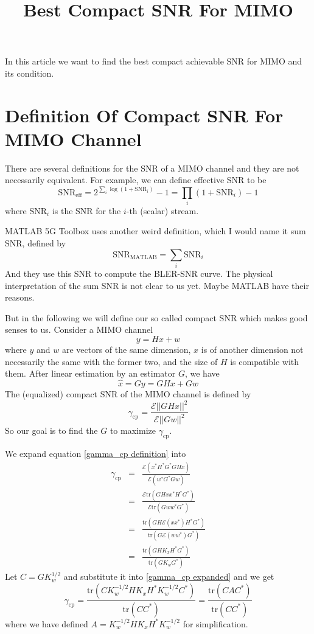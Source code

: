 \documentclass[12pt]{article}
\title{Best Compact SNR For MIMO}
\theoremstyle{definition}
\begin{document}
\maketitle
In this article we want to find the best compact achievable SNR for MIMO and its condition.
\section{Definition Of Compact SNR For MIMO Channel}
There are several definitions for the SNR of a MIMO channel and they are not necessarily equivalent. For example, we can define effective SNR to be
$$
\mbox{SNR}_{\mbox{eff}}=2^{\sum_i\log(1+\mbox{SNR}_i)}-1=\prod_i(1+\mbox{SNR}_i)-1
$$
where $\mbox{SNR}_i$ is the SNR for the $i$-th (scalar) stream.

MATLAB 5G Toolbox\textsuperscript{\texttrademark} uses another weird definition, which I would name it sum SNR, defined by
$$
\mbox{SNR}_{\mbox{MATLAB}}=\sum_i\mbox{SNR}_i
$$
And they use this SNR to compute the BLER-SNR curve. The physical interpretation of the sum SNR is not clear to us yet. Maybe MATLAB have their reasons.

But in the following we will define our so called compact SNR which makes good senses to us. Consider a MIMO channel
$$y=Hx+w$$
where $y$ and $w$ are vectors of the same dimension, $x$ is of another dimension not necessarily the same with the former two, and the size of $H$ is compatible with them. After linear estimation by an estimator $G$, we have
$$\hat{x}=Gy=GHx+Gw$$
The (equalized) compact SNR of the MIMO channel is defined by
\begin{equation}
\gamma_{\mbox{cp}}=\frac{\mathcal{E}||GHx||^2}{\mathcal{E}||Gw||^2}\label{gamma_cp definition}	
\end{equation}
So our goal is to find the $G$ to maximize $\gamma_{\mbox{cp}}$. 

We expand equation \ref{gamma_cp definition} into 
\begin{eqnarray}
	\gamma_{\mbox{cp}}&=&\frac{\mathcal{E}(x^*H^*G^*GHx)}{\mathcal{E}(w^*G^*Gw)}\nonumber\\
	&=& \frac{\mathcal{E}\mbox{tr}(GHxx^*H^*G^*)}{\mathcal{E}\mbox{tr}(Gww^*G^*)}\nonumber\\
	&=&\frac{\mbox{tr}(GH\mathcal{E}(xx^*)H^*G^*)}{\mbox{tr}(G\mathcal{E}(ww^*)G^*)}\nonumber\\
	&=&\frac{\mbox{tr}(GHK_xH^*G^*)}{\mbox{tr}(GK_wG^*)}\label{gamma_cp expanded}
\end{eqnarray}
Let $C=GK_w^{1/2}$ and substitute it into \ref{gamma_cp expanded} and we get
\begin{equation}
	\gamma_{\mbox{cp}}=\frac{\mbox{tr}(CK_w^{-1/2}HK_xH^*K_w^{-1/2}C^*)}{\mbox{tr}(CC^*)}=\frac{\mbox{tr}(CAC^*)}{\mbox{tr}(CC^*)}\label{gamma_cp simpified}
\end{equation}
where we have defined $A=K_w^{-1/2}HK_xH^*K_w^{-1/2}$ for simplification.
\end{document}
